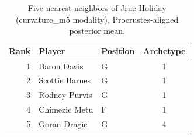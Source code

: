 \begin{table}[htbp]
  \centering\small
  \begin{tabular}{rllc}
    \toprule
    Rank & Player & Position & Archetype \\
    \midrule
    1 & Baron Davis & G & 1 \\
    2 & Scottie Barnes & G & 1 \\
    3 & Rodney Purvis & G & 1 \\
    4 & Chimezie Metu & F & 1 \\
    5 & Goran Dragic & G & 4 \\
    \bottomrule
  \end{tabular}
  \caption{Five nearest neighbors of Jrue Holiday (curvature_m5 modality), Procrustes-aligned posterior mean.}
  \label{tab:Jrue_Holiday_neighbors_curvature_m5}
\end{table}

